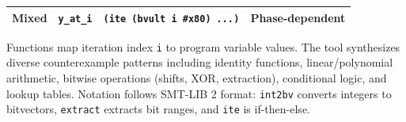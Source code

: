 \begin{table}[t]
\begin{tabular}{@{}llp{5.5cm}l@{}}
Mixed & \texttt{y\_at\_i} & 
\texttt{(ite (bvult i \#x80) \textit{...})} & 
Phase-dependent \\

\bottomrule
\end{tabular}
\vspace{0.5em}
\begin{flushleft}
\footnotesize
Functions map iteration index \texttt{i} to program variable values.
The tool synthesizes diverse counterexample patterns including identity functions, 
linear/polynomial arithmetic, bitwise operations (shifts, XOR, extraction), 
conditional logic, and lookup tables.
Notation follows SMT-LIB 2 format: \texttt{int2bv} converts integers to bitvectors,
\texttt{extract} extracts bit ranges, and \texttt{ite} is if-then-else.
\end{flushleft}
\end{table}
